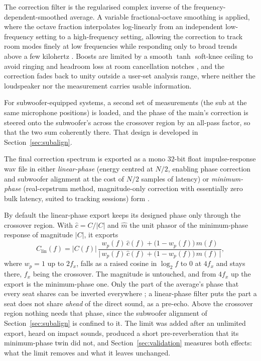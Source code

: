 \documentclass[10pt,a4paper]{article}
\begin{document}
The correction filter is the regularised complex inverse of the frequency-dependent-smoothed average. A variable fractional-octave smoothing is applied, where the octave fraction interpolates log-linearly from an independent low-frequency setting to a high-frequency setting, allowing the correction to track room modes finely at low frequencies while responding only to broad trends above a few kilohertz \cite{Hatziantoniou2000}. Boosts are limited by a smooth $\tanh$ soft-knee ceiling to avoid ringing and headroom loss at room cancellation notches \cite{Kirkeby1999}, and the correction fades back to unity outside a user-set analysis range, where neither the loudspeaker nor the measurement carries usable information.

For subwoofer-equipped systems, a second set of measurements (the sub at the same microphone positions) is loaded, and the phase of the main's correction is steered onto the subwoofer's across the crossover region by an all-pass factor, so that the two sum coherently there. That design is developed in Section~\ref{sec:subalign}.

The final correction spectrum is exported as a mono 32-bit float impulse-response wav file in either \emph{linear-phase} (energy centred at $N/2$, enabling phase correction and subwoofer alignment at the cost of $N/2$ samples of latency) or \emph{minimum-phase} (real-cepstrum method, magnitude-only correction with essentially zero bulk latency, suited to tracking sessions) form \cite{OppenheimSchafer}.

By default the linear-phase export keeps its designed phase only through the crossover region. With $\hat c = C/|C|$ and $\hat m$ the unit phasor of the minimum-phase response of magnitude $|C|$, it exports
\begin{equation}
  C_{\mathrm{lin}}(f) = |C(f)|\,
     \frac{w_p(f)\,\hat c(f) + \bigl(1-w_p(f)\bigr)\,\hat m(f)}
          {\bigl|\,w_p(f)\,\hat c(f) + \bigl(1-w_p(f)\bigr)\,\hat m(f)\,\bigr|},
  \label{eq:phaselimit}
\end{equation}
where $w_p=1$ up to $2f_x$, falls as a raised cosine in $\log_2 f$ to $0$ at $4f_x$ and stays there, $f_x$ being the crossover. The magnitude is untouched, and from $4f_x$ up the export is the minimum-phase one. Only the part of the average's phase that every seat shares can be inverted everywhere \cite{NeelyAllen, Mourjopoulos1994}; a linear-phase filter puts the part a seat does not share \emph{ahead} of the direct sound, as a pre-echo. Above the crossover region nothing needs that phase, since the subwoofer alignment of Section~\ref{sec:subalign} is confined to it. The limit was added after an unlimited export, heard on impact sounds, produced a short pre-reverberation that its minimum-phase twin did not, and Section~\ref{sec:validation} measures both effects: what the limit removes and what it leaves unchanged.
\end{document}
